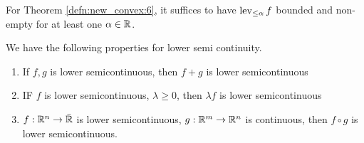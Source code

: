 \begin{remark}
  For Theorem \ref{defn:new_convex:6}, it suffices to have $\operatorname*{lev}_{\leq
    \alpha} f$ bounded and non-empty for at least one $\alpha \in \mathbb{R}$. 
\end{remark}

\begin{proposition} We have the following properties for lower semi continuity.
  \begin{enumerate}
  \item If $f,g $ is lower semicontinuous, then $f + g$ is lower semicontinuous
  \item IF $f$ is lower semicontinuous, $\lambda \geq 0$, then
    $\lambda f$ is lower semicontinuous
  \item $f: \mathbb{R}^{n} \rightarrow \bar {\mathbb{R}}$ is lower semicontinuous, $g:
    \mathbb{R}^{m} \rightarrow \mathbb{R}^{n}$ is continuous, then $f \circ g$ is lower semicontinuous.
  \end{enumerate}
\end{proposition}

